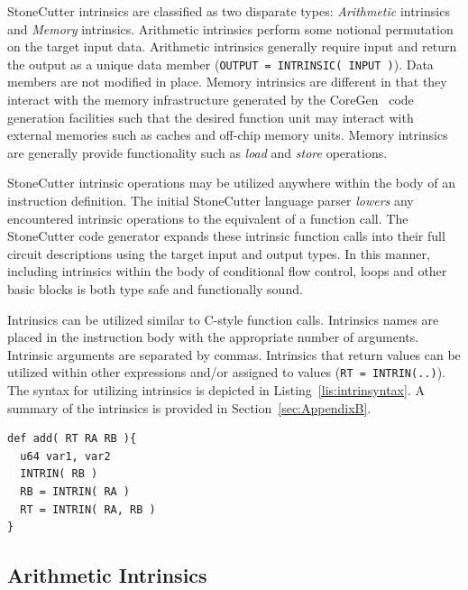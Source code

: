 \documentclass{article}
\begin{document}
StoneCutter intrinsics are classified as two disparate types: \textit{Arithmetic} intrinsics and 
\textit{Memory} intrinsics.  Arithmetic intrinsics perform some notional permutation on the target 
input data.  Arithmetic intrinsics generally require input and return the output as a unique data 
member (\texttt{OUTPUT = INTRINSIC( INPUT )}).  Data members are not modified in place.  
Memory intrinsics are different in that they interact with the memory infrastructure generated 
by the CoreGen~\cite{IRSpec} code generation facilities such that the desired function unit may interact with 
external memories such as caches and off-chip memory units.  Memory intrinsics are generally 
provide functionality such as \textit{load} and \textit{store} operations.  

StoneCutter intrinsic operations may be utilized anywhere within the body of an instruction definition.  
The initial StoneCutter language parser \textit{lowers} any encountered intrinsic operations to the equivalent 
of a function call.  The StoneCutter code generator expands these intrinsic function calls into their 
full circuit descriptions using the target input and output types.  In this manner, including intrinsics within 
the body of conditional flow control, loops and other basic blocks is both type safe and functionally sound.    

Intrinsics can be utilized similar to C-style function calls.  Intrinsics names are placed in the instruction body 
with the appropriate number of arguments.  Intrinsic arguments are separated by commas.  Intrinsics that return 
values can be utilized within other expressions and/or assigned to values (\texttt{RT = INTRIN(..)}).  
The syntax for utilizing intrinsics is depicted in Listing~\ref{lis:intrinsyntax}.  A summary of the intrinsics is provided 
in Section~\ref{sec:AppendixB}.    

\vspace{0.125in}
\begin{lstlisting}[frame=single,style=base,caption={Intrinsic Syntax},captionpos=b,label={lis:intrinsyntax}]
def add( RT RA RB ){
  u64 var1, var2
  INTRIN( RB )
  RB = INTRIN( RA )
  RT = INTRIN( RA, RB )
}
\end{lstlisting}

\clearpage
\subsection{Arithmetic Intrinsics}
\label{sec:ArithIntrinsics}
\end{document}
